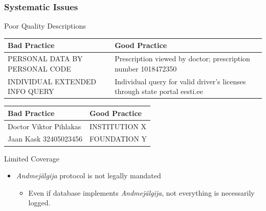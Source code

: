 \documentclass[aspectratio=169,11pt]{beamer}
\begin{document}
\begin{frame}
\frametitle{Systematic Issues}
\begin{block}{Poor Quality Descriptions}
\begin{center}
\begin{tabular}{|p{3cm}|p{4cm}|}
\hline
\textbf{Bad Practice} & \textbf{Good Practice} \\
\hline
PERSONAL DATA BY PERSONAL CODE & Prescription viewed by doctor; prescription number 1018472350 \\
\hline
INDIVIDUAL EXTENDED INFO QUERY & Individual query for valid driver's licenses through state portal eesti.ee \\
\hline
\end{tabular}
\begin{tabular}{|p{2cm}|p{3cm}|}
\hline
\textbf{Bad Practice} & \textbf{Good Practice} \\
\hline
Doctor Viktor Pihlakas & INSTITUTION X \\
\hline
Jaan Kask 32405023456 & FOUNDATION Y \\
\hline
\end{tabular}
\end{center}
\end{block}

\begin{block}{Limited Coverage}
\begin{itemize}
    \item \textit{Andmejälgija} protocol is not legally mandated
    \begin{itemize}
        \item Even if database implements \textit{Andmejälgija}, not everything is necessarily logged.
    \end{itemize}
\end{itemize}
\end{block}
\end{frame}

\end{document}
